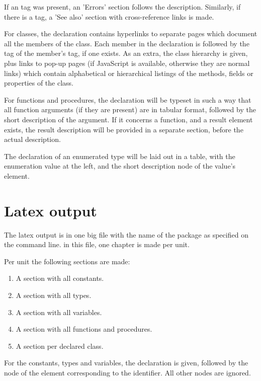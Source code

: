 If an  tag was present, an 'Errors' section follows the
description. Similarly, if there is a  tag, a 'See also'
section with cross-reference links is made.

For classes, the declaration contains hyperlinks to separate pages which 
document all the members of the class. Each member in the declaration is 
followed by the  tag of the member's  tag, if one
exists. As an extra, the class hierarchy is given, plus links to pop-up pages
(if JavaScript is available, otherwise they are normal links) which contain
alphabetical or hierarchical listings of the methods, fields or properties
of the class.

For functions and procedures, the declaration will be typeset in such a way
that all function arguments (if they are present) are in tabular format, 
followed by the short description of the argument. If it concerns a
function, and a result element exists, the result description will be
provided in a separate section, before the actual description.

The declaration of an enumerated type will be laid out in a table, with the
enumeration value at the left, and the short description node of the value's 
element.


\section{Latex output}

The latex output is in one big file with the name of the package as
specified on the command line. in this file, one chapter is made per 
unit.

Per unit the following sections are made:

\begin{enumerate}
\item A section with all constants.
\item A section with all types.
\item A section with all variables.
\item A section with all functions and procedures.
\item A section per declared class.
\end{enumerate}

For the constants, types and variables, the declaration is given, followed
by the  node of the element corresponding to the identifier.
All other nodes are ignored. 

